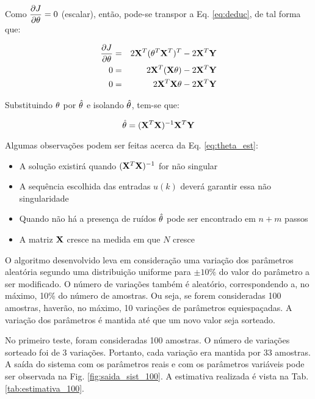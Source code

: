 Como $\displaystyle\frac{\partial J}{\partial \mathbf{\theta}} = 0$ (escalar), então,
pode-se transpor a Eq. \ref{eq:deduc}, de tal forma que:

\begin{eqnarray}
\frac{\partial J}{\partial \mathbf{\theta}} & = & 
2\mathbf{X}^T(\mathbf{\theta}^T\mathbf{X}^T)^T - 2\mathbf{X}^T\mathbf{Y}\nonumber\\
0 & = & 2\mathbf{X}^T(\mathbf{X\theta}) - 2\mathbf{X}^T\mathbf{Y}\nonumber\\
0 & = & 2\mathbf{X}^T\mathbf{X\theta} - 2\mathbf{X}^T\mathbf{Y}
\end{eqnarray}

Substituindo $\mathbf{\theta}$ por $\hat{\mathbf{\theta}}$ e isolando
$\hat{\mathbf{\theta}}$, tem-se que:

\begin{equation}\label{eq:theta_est}
\hat{\mathbf{\theta}} = (\mathbf{X}^T\mathbf{X})^{-1} \mathbf{X}^T\mathbf{Y}
\end{equation}

Algumas observações podem ser feitas acerca da Eq. \ref{eq:theta_est}:

\begin{itemize}
    \item A solução existirá quando $(\mathbf{X}^T\mathbf{X})^{-1}$ for não singular
    \item A sequência escolhida das entradas $u(k)$ deverá garantir essa
          não singularidade
    \item Quando não há a presença de ruídos $\hat{\mathbf{\theta}}$ pode ser
          encontrado em $n+m$ passos
    \item A matriz $\mathbf{X}$ cresce na medida em que $N$ cresce
\end{itemize}

O algoritmo desenvolvido leva em consideração uma variação dos parâmetros
aleatória segundo uma distribuição uniforme para $\pm 10\%$ do valor do
parâmetro a ser modificado. O número de variações também é aleatório,
correspondendo a, no máximo, 10\% do número de amostras. Ou seja, se forem
consideradas 100 amostras, haverão, no máximo, 10 variações de parâmetros
equiespaçadas. A variação dos parâmetros é mantida até que um novo valor seja
sorteado. 


No primeiro teste, foram consideradas 100 amostras. O número de variações
sorteado foi de 3 variações. Portanto, cada variação era mantida por 33
amostras. A saída do sistema com os parâmetros reais e com os parâmetros
variáveis pode ser observada na Fig. \ref{fig:saida_sist_100}. A estimativa
realizada é vista na Tab. \ref{tab:estimativa_100}.
